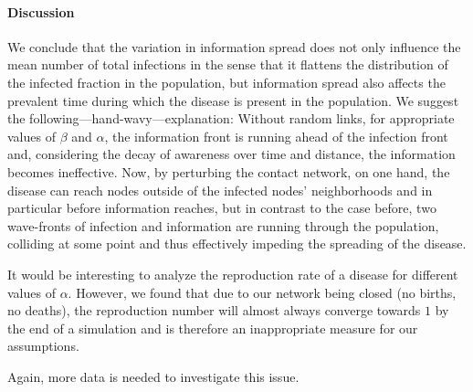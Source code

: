 \documentclass[11pt]{article}
\begin{document}
\paragraph{Discussion}
We conclude that the variation in information spread does not only influence the mean number of total infections in the sense that it flattens the distribution of the infected fraction in the population, but information spread also affects the prevalent time during which the disease is present in the population. We suggest the following---hand-wavy---explanation: Without random links, for appropriate values of $\beta$ and $\alpha$, the information front is running ahead of the infection front and, considering the decay of awareness over time and distance, the information becomes ineffective. Now, by perturbing the contact network, on one hand, the disease can reach nodes outside of the infected nodes' neighborhoods and in particular before information reaches, but in contrast to the case before, two wave-fronts of infection and information are running through the population, colliding at some point and thus effectively impeding the spreading of the disease.

It would be interesting to analyze the reproduction rate of a disease for different values of $\alpha$. However, we found that due to our network being closed (no births, no deaths), the reproduction number will almost always converge towards $1$ by the end of a simulation and is therefore an inappropriate measure for our assumptions.

Again, more data is needed to investigate this issue.
\end{document}

